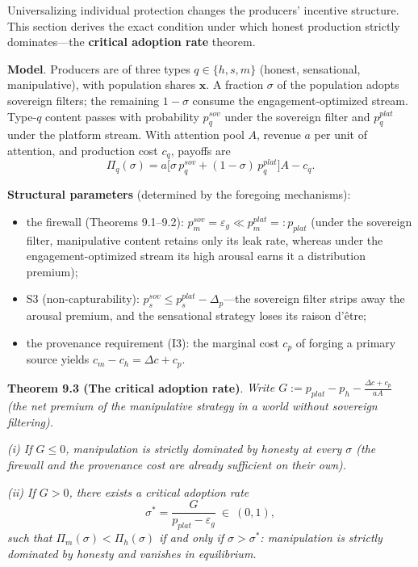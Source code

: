 \documentclass[
  11pt]{article}
\providecommand{\tightlist}{%
  \setlength{\itemsep}{0pt}\setlength{\parskip}{0pt}}
\begin{document}
Universalizing individual protection changes the producers' incentive
structure. This section derives the exact condition under which honest
production strictly dominates---the \textbf{critical adoption rate}
theorem.

\textbf{Model}. Producers are of three types \(q \in \{h, s, m\}\)
(honest, sensational, manipulative), with population shares
\(\mathbf{x}\). A fraction \(\sigma\) of the population adopts sovereign
filters; the remaining \(1-\sigma\) consume the engagement-optimized
stream. Type-\(q\) content passes with probability \(p_q^{sov}\) under
the sovereign filter and \(p_q^{plat}\) under the platform stream. With
attention pool \(A\), revenue \(a\) per unit of attention, and
production cost \(c_q\), payoffs are
\[\Pi_q(\sigma) = a\big[\sigma\, p_q^{sov} + (1-\sigma)\, p_q^{plat}\big] A - c_q.\]

\textbf{Structural parameters} (determined by the foregoing mechanisms):

\begin{itemize}
\tightlist
\item
  the firewall (Theorems 9.1--9.2):
  \(p_m^{sov} = \varepsilon_g \ll p_m^{plat} =: p_{plat}\) (under the
  sovereign filter, manipulative content retains only its leak rate,
  whereas under the engagement-optimized stream its high arousal earns
  it a distribution premium);
\item
  S3 (non-capturability): \(p_s^{sov} \le p_s^{plat} - \Delta_p\)---the
  sovereign filter strips away the arousal premium, and the sensational
  strategy loses its raison d'être;
\item
  the provenance requirement (I3): the marginal cost \(c_p\) of forging
  a primary source yields \(c_m - c_h = \Delta c + c_p\).
\end{itemize}

\textbf{Theorem 9.3 (The critical adoption rate)}. \emph{Write
\(G := p_{plat} - p_h - \frac{\Delta c + c_p}{aA}\) (the net premium of
the manipulative strategy in a world without sovereign filtering).}

\emph{(i) If \(G \le 0\), manipulation is strictly dominated by honesty
at every \(\sigma\) (the firewall and the provenance cost are already
sufficient on their own).}

\emph{(ii) If \(G > 0\), there exists a critical adoption rate}
\[\sigma^* = \frac{G}{p_{plat} - \varepsilon_g} \ \in\ (0,1),\]
\emph{such that \(\Pi_m(\sigma) < \Pi_h(\sigma)\) if and only if
\(\sigma > \sigma^*\): manipulation is strictly dominated by honesty and
vanishes in equilibrium.}
\end{document}
